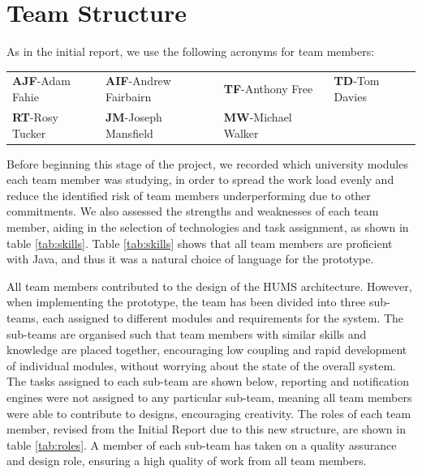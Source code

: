 \section{Team Structure}
\label{sec:team}

As in the initial report, we use the following acronyms for team members:

\begin{tabular}{ p{3cm} p{4cm} p{3.5cm} p{3.5cm} }
  \textbf{AJF}-Adam Fahie &
  \textbf{AIF}-Andrew Fairbairn &
  \textbf{TF}-Anthony Free &
  \textbf{TD}-Tom Davies \\
    \textbf{RT}-Rosy Tucker &
  \textbf{JM}-Joseph Mansfield &
  \textbf{MW}-Michael Walker \\
\end{tabular}

Before beginning this stage of the project, we recorded which university 
modules each team member was studying, in order to spread the work load evenly and reduce the identified risk of team members underperforming due to other commitments. We also assessed the strengths and weaknesses of each team member, aiding in the selection of technologies and task assignment, as shown in table \ref{tab:skills}. Table \ref{tab:skills} shows that all team members are proficient with Java, and thus it was a natural choice of language for the prototype.

All team members contributed to the design of the HUMS architecture. 
However, when implementing the prototype, the team has been divided into three sub-teams, each assigned to different modules and requirements for the system. The sub-teams are organised such that team members with similar skills and  knowledge are placed together, encouraging low coupling and rapid development of individual modules, without worrying about the state of the overall system. The tasks assigned to each sub-team are shown below, reporting and notification engines were not assigned to any particular sub-team, meaning all team members were able to contribute to designs, 
encouraging creativity. The roles of each team member, revised from the Initial Report due to this new structure, are shown in table \ref{tab:roles}. A member of each sub-team has taken on a quality assurance and design role, ensuring a high quality of work from all team members.

